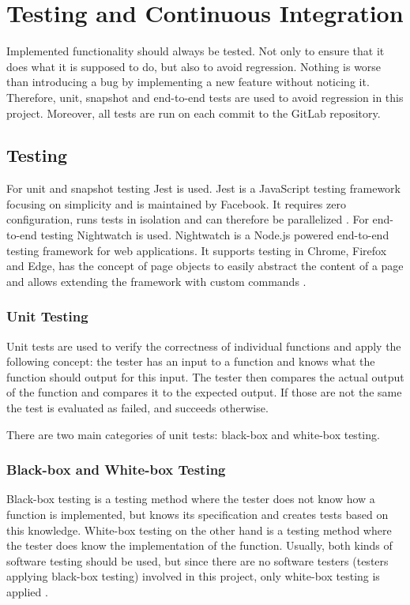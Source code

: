 \chapter{Testing and Continuous Integration}
\label{chapter:testingAndCI}

Implemented functionality should always be tested. Not only to ensure that it does what it is supposed to do, but also to avoid regression. Nothing is worse than introducing a bug by implementing a new feature without noticing it. Therefore, unit, snapshot and end-to-end tests are used to avoid regression in this project.
Moreover, all tests are run on each commit to the GitLab repository.

\section{Testing}
\label{section:testing}
For unit and snapshot testing Jest is used. Jest is a JavaScript testing framework focusing on simplicity and is maintained by Facebook. It requires zero configuration, runs tests in isolation and can therefore be parallelized \cite{Jest}. For end-to-end testing Nightwatch is used. Nightwatch is a Node.js powered end-to-end testing framework for web applications. It supports testing in Chrome, Firefox and Edge, has the concept of page objects to easily abstract the content of a page and allows extending the framework with custom commands \cite{Nightwatch}.

\subsection{Unit Testing}
\label{subsection:unitTesting}
Unit tests are used to verify the correctness of individual functions and apply the following concept: the tester has an input to a function and knows what the function should output for this input. The tester then compares the actual output of the function and compares it to the expected output. If those are not the same the test is evaluated as failed, and succeeds otherwise.

There are two main categories of unit tests: black-box and white-box testing.

\subsection*{Black-box and White-box Testing}
Black-box testing is a testing method where the tester does not know how a function is implemented, but knows its specification and creates tests based on this knowledge. White-box testing on the other hand is a testing method where the tester does know the implementation of the function. Usually, both kinds of software testing should be used, but since there are no software testers (testers applying black-box testing) involved in this project, only white-box testing is applied \cite{BlackBoxWhiteBoxTesting}.

